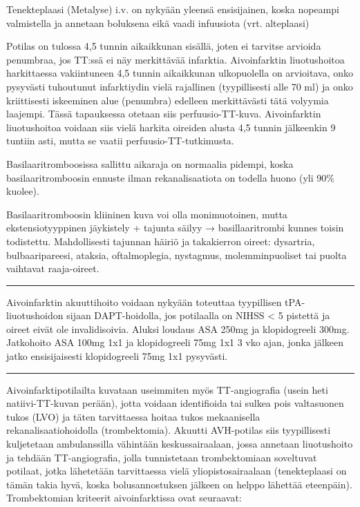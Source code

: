 \documentclass[
]{book}
\begin{document}
Tenekteplaasi (Metalyse) i.v. on nykyään yleensä ensisijainen, koska nopeampi valmistella ja annetaan boluksena eikä vaadi infuusiota (vrt. alteplaasi)

Potilas on tulossa 4,5 tunnin aikaikkunan sisällä, joten ei tarvitse arvioida penumbraa, jos TT:ssä ei näy merkittävää infarktia. Aivoinfarktin liuotushoitoa harkittaessa vakiintuneen 4,5 tunnin aikaikkunan ulkopuolella on arvioitava, onko pysyvästi tuhoutunut infarktiydin vielä rajallinen (tyypillisesti alle 70 ml) ja onko kriittisesti iskeeminen alue (penumbra) edelleen merkittävästi tätä volyymia laajempi. Tässä tapauksessa otetaan siis perfuusio-TT-kuva. Aivoinfarktin liuotushoitoa voidaan siis vielä harkita oireiden alusta 4,5 tunnin jälkeenkin 9 tuntiin asti, mutta se vaatii perfuusio-TT-tutkimusta.

Basilaaritromboosissa sallittu aikaraja on normaalia pidempi, koska basilaaritromboosin ennuste ilman rekanalisaatiota on todella huono (yli 90\% kuolee).

Basilaaritromboosin kliininen kuva voi olla monimuotoinen, mutta ekstensiotyyppinen jäykistely + tajunta säilyy → basillaaritrombi kunnes toisin todistettu. Mahdollisesti tajunnan häiriö ja takakierron oireet: dysartria, bulbaaripareesi, ataksia, oftalmoplegia, nystagmus, molemminpuoliset tai puolta vaihtavat raaja-oireet.

\begin{center}\rule{0.5\linewidth}{0.5pt}\end{center}

Aivoinfarktin akuuttihoito voidaan nykyään toteuttaa tyypillisen tPA-liuotushoidon sijaan DAPT-hoidolla, jos potilaalla on NIHSS \textless{} 5 pistettä ja oireet eivät ole invalidisoivia. Aluksi loudaus ASA 250mg ja klopidogreeli 300mg. Jatkohoito ASA 100mg 1x1 ja klopidogreeli 75mg 1x1 3 vko ajan, jonka jälkeen jatko ensisijaisesti klopidogreeli 75mg 1x1 pysyvästi.

\begin{center}\rule{0.5\linewidth}{0.5pt}\end{center}

Aivoinfarktipotilailta kuvataan useimmiten myös TT-angiografia (usein heti natiivi-TT-kuvan perään), jotta voidaan identifioida tai sulkea pois valtasuonen tukos (LVO) ja täten tarvittaessa hoitaa tukos mekaanisella rekanalisaatiohoidolla (trombektomia). Akuutti AVH-potilas siis tyypillisesti kuljetetaan ambulanssilla vähintään keskussairaalaan, jossa annetaan liuotushoito ja tehdään TT-angiografia, jolla tunnistetaan trombektomiaan soveltuvat potilaat, jotka lähetetään tarvittaessa vielä yliopistosairaalaan (tenekteplaasi on tämän takia hyvä, koska bolusannostuksen jälkeen on helppo lähettää eteenpäin). Trombektomian kriteerit aivoinfarktissa ovat seuraavat:
\end{document}
